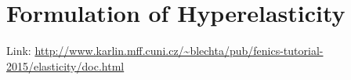 

\graphicspath{
{images/}
}



\setcounter{tocdepth}{2}

\section{Formulation of Hyperelasticity}

Link: \url{http://www.karlin.mff.cuni.cz/~blechta/pub/fenics-tutorial-2015/elasticity/doc.html}


